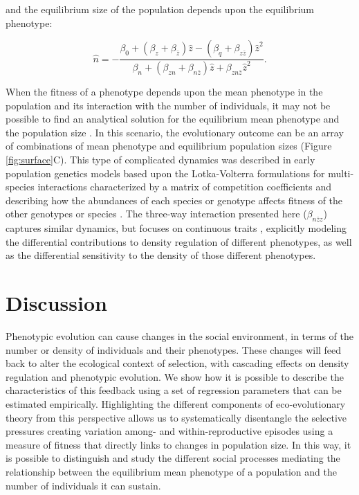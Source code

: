 \documentclass{article}
\begin{document}
\noindent and the equilibrium size of the population depends upon the equilibrium phenotype:

\begin{equation}  \label{eq: full}
	\hat{n} = -\frac{\beta_{0}+(\beta_{z}  +  \beta_{\bar{z}})\hat{z} - (\beta_{q} + \beta_{z\bar{z}})\hat{z}^2 }{\beta_{n} + (\beta_{zn} + \beta_{n\bar{z}}) \hat{z} + \beta_{zn\bar{z}}\hat{z}^2}.
\end{equation}

When the fitness of a phenotype depends upon the mean phenotype in the population and its interaction with the number of individuals, it may not be possible to find an analytical solution for the equilibrium mean phenotype and the population size \citep{Engen2020}. In this scenario, the evolutionary outcome can be an array of combinations of mean phenotype and equilibrium population sizes (Figure \ref{fig:surface}C). This type of complicated dynamics was described in early population genetics models based upon the Lotka-Volterra formulations for multi-species interactions characterized by a matrix of competition coefficients and describing how the abundances of each species or genotype affects fitness of the other genotypes or species \citep{Clarke1972, Anderson1983}. The three-way interaction presented here ($\beta_{n\bar{z}z}$) captures similar dynamics, but focuses on continuous traits \citep{Engen2020}, explicitly modeling the differential contributions to density regulation of different phenotypes, as well as the differential sensitivity to the density of those different phenotypes.   

\section{Discussion}
Phenotypic evolution can cause changes in the social environment, in terms of the number or density of individuals and their phenotypes. These changes will feed back to alter the ecological context of selection, with cascading effects on density regulation and phenotypic evolution. We show how it is possible to describe the characteristics of this feedback using a set of regression parameters that can be estimated empirically. Highlighting the different components of eco-evolutionary theory from this perspective allows us to systematically disentangle the selective pressures creating variation among- and within-reproductive episodes using a measure of fitness that directly links to changes in population size. In this way, it is possible to distinguish and study the different social processes mediating the relationship between the equilibrium mean phenotype of a population and the number of individuals it can sustain. 
\end{document}
